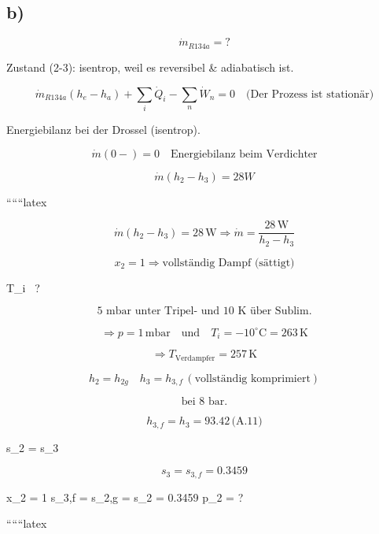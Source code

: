 

\subsection*{b)}

\[
\dot{m}_{R134a} = ?
\]

Zustand (2-3): isentrop, weil es reversibel \& adiabatisch ist.

\[
\dot{m}_{R134a} (h_e - h_a) + \sum_i \dot{Q}_i - \sum_n \dot{W}_n = 0 \quad \text{(Der Prozess ist stationär)}
\]

Energiebilanz bei der Drossel (isentrop).

\[
\dot{m}(0-) = 0 \quad \text{Energiebilanz beim Verdichter}
\]

\[
\dot{m}(h_2 - h_3) = 28W
\]

``````latex


\[
\dot{m} (h_2 - h_3) = 28 \, \text{W} \Rightarrow \dot{m} = \frac{28 \, \text{W}}{h_2 - h_3}
\]

\[
x_2 = 1 \Rightarrow \text{vollständig Dampf (sättigt)}
\]

 T_i \, ?

\[
\text{5 mbar unter Tripel- und 10 K über Sublim.}
\]

\[
\Rightarrow p = 1 \, \text{mbar} \quad \text{und} \quad T_i = -10^\circ \text{C} = 263 \, \text{K}
\]

\[
\Rightarrow T_{\text{Verdampfer}} = 257 \, \text{K}
\]

\[
h_2 = h_{2g} \quad h_3 = h_{3,f} \, (\text{vollständig komprimiert})
\]

\[
\text{bei 8 bar.}
\]

\[
h_{3,f} = h_3 = 93.42 \, \text{(A.11)}
\]

 \Rightarrow s_2 = s_3

\[
s_3 = s_{3,f} = 0.3459
\]

 \quad x_2 = 1 \Rightarrow s_{3,f} = s_{2,g} = s_2 = 0.3459 \Rightarrow p_2 = ?
\]

``````latex